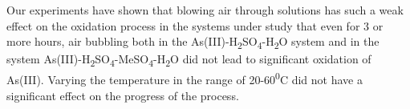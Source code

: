 % 
% 

Our experiments have shown that blowing air through solutions has such a
weak effect on the oxidation process in the systems under study that
even for 3 or more hours, air bubbling both in the
As(III)-H\textsubscript{2}SO\textsubscript{4}-H\textsubscript{2}O system
and in the system
As(III)-H\textsubscript{2}SO\textsubscript{4}-MeSO\textsubscript{4}-H\textsubscript{2}O
did not lead to significant oxidation of As(III). Varying the
temperature in the range of 20-60\textsuperscript{0}C did not have a
significant effect on the progress of the process.

